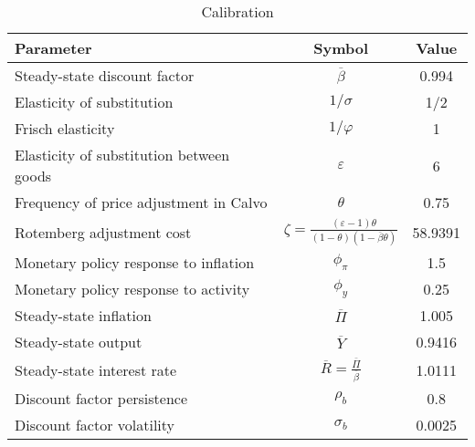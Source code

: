 \begin{table}[H]
  \centering
  \caption{Calibration}
    \begin{tabular}{lcc}
    \toprule
    Parameter & Symbol & Value \\
    \midrule
    Steady-state discount factor & $\overline{\beta}$ & 0.994 \\
    Elasticity of substitution & $1/\sigma$ & 1/2 \\
    Frisch elasticity & $1/\varphi$ & 1 \\
    Elasticity of substitution between goods & $\varepsilon$ & 6 \\
    Frequency of price adjustment in Calvo & $\theta$ & 0.75 \\
    Rotemberg adjustment cost & $\zeta=\frac{(\varepsilon-1)\theta}{(1-\theta)(1-\overline{\beta}\theta)}$ & 58.9391 \\
    Monetary policy response to inflation & $\phi_{\pi}$ & 1.5 \\
    Monetary policy response to activity & $\phi_y$ & 0.25 \\
    Steady-state inflation  & $\overline{\Pi}$ & 1.005 \\
    Steady-state output & $\overline{Y}$ & 0.9416 \\
    Steady-state interest rate & $\overline{R}=\frac{\overline{\Pi}}{\overline{\beta}}$ & 1.0111 \\
    Discount factor persistence & $\rho_b$ & 0.8 \\
    Discount factor volatility & $\sigma_b$ & 0.0025 \\    
    \bottomrule
    \end{tabular}%
  \label{tab:calibration}%
\end{table}%